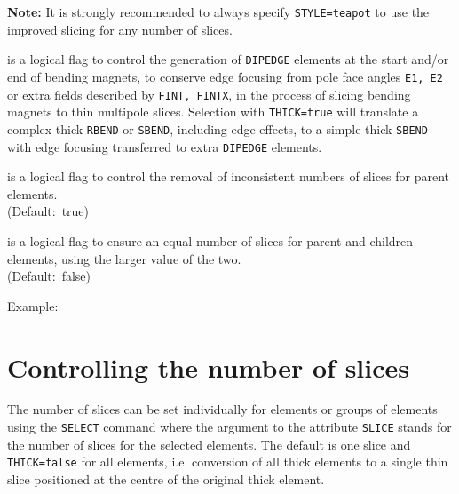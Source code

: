 \begin{madlist}
\begin{5.02.04}
   \textbf{Note:} It is strongly recommended to always specify
   {\tt STYLE=teapot} to use the improved slicing for any number of
   slices. 
\end{5.02.04}
      
    is a logical flag to control the generation of
   {\tt DIPEDGE} elements at the start and/or end of bending magnets,
   to conserve edge focusing from pole face angles {\tt E1, E2}
   or extra fields described by {\tt FINT, FINTX}, in the
   process of slicing bending magnets to thin multipole slices.   
   Selection with {\tt THICK=true} will translate a complex thick 
   {\tt RBEND} or {\tt SBEND}, including edge effects, to a simple
   thick {\tt SBEND} with edge focusing transferred to extra 
   {\tt DIPEDGE} elements. \\ 


\begin{5.02.04}
    is a logical flag to control the removal of
   inconsistent numbers of slices for parent elements. \\
   (Default:~true)

    is a logical flag to ensure an equal number of slices
   for parent and children elements, using the larger value of the two. \\
   (Default:~false)
\end{5.02.04}
\end{madlist}


   Example:
   
   

\section{Controlling the number of slices}

The number of slices can be set individually for elements or groups of
elements using the {\tt SELECT} command
where the argument to the attribute {\tt SLICE} stands for the number of
slices for the selected elements. The default is one slice and
{\tt THICK=false} for all elements, i.e. conversion of all thick
elements to a single thin slice positioned at the centre of the original
thick element.

